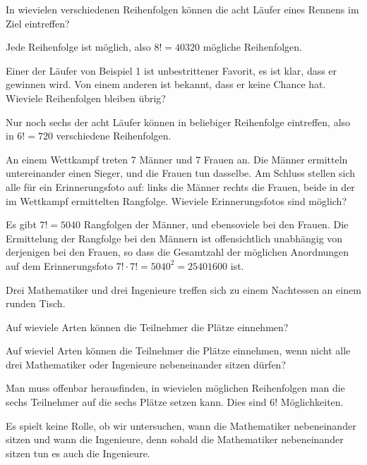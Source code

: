 \begin{beispiele}
\item In wievielen verschiedenen Reihenfolgen können die acht Läufer
eines Rennens im Ziel eintreffen?

\begin{loesung}
Jede Reihenfolge ist möglich, also $8!=40320$ mögliche Reihenfolgen.
\end{loesung}

\item Einer der Läufer von Beispiel 1 ist unbestrittener Favorit,
es ist klar, dass er gewinnen wird.
Von einem anderen ist bekannt, dass er keine Chance hat.
Wieviele Reihenfolgen bleiben übrig?

\begin{loesung}
Nur noch sechs der acht Läufer können in beliebiger Reihenfolge
eintreffen, also in $6!=720$ verschiedene Reihenfolgen.
\end{loesung}

\item An einem Wettkampf treten 7 Männer und 7 Frauen an.
Die Männer
ermitteln untereinander einen Sieger, und die Frauen tun dasselbe.
Am Schluss stellen sich alle für ein Erinnerungsfoto auf: links
die Männer rechts die Frauen, beide in der im Wettkampf ermittelten
Rangfolge.
Wieviele Erinnerungsfotos sind möglich?

\begin{loesung}
Es gibt $7!=5040$ Rangfolgen der Männer, und ebensoviele bei den
Frauen.
Die Ermittelung der Rangfolge bei den Männern ist offensichtlich
unabhängig von derjenigen bei den Frauen, so dass die Gesamtzahl der
möglichen Anordnungen auf dem Erinnerungsfoto $7!\cdot 7!=5040^2=25401600$
ist.
\end{loesung}

\item
\label{nachtessen}
Drei Mathematiker und drei Ingenieure treffen sich zu einem
Nachtessen an einem runden Tisch.
\begin{teilaufgaben}
\item
Auf wieviele Arten können die Teilnehmer die Plätze einnehmen?
\item
Auf wieviel Arten können 
die Teilnehmer die Plätze einnehmen, wenn nicht alle drei Mathematiker
oder Ingenieure nebeneinander sitzen dürfen?
\end{teilaufgaben}

\begin{loesung}
\begin{teilaufgaben}
\item
Man muss offenbar herausfinden, in wievielen möglichen Reihenfolgen
man die sechs Teilnehmer auf die sechs Plätze setzen kann.
Dies sind $6!$ Möglichkeiten.
\item
Es spielt keine Rolle, ob wir untersuchen, wann die Mathematiker 
nebeneinander sitzen und wann die Ingenieure, denn sobald die Mathematiker
nebeneinander sitzen tun es auch die Ingenieure.


\end{teilaufgaben}
\end{loesung}
\end{beispiele}
